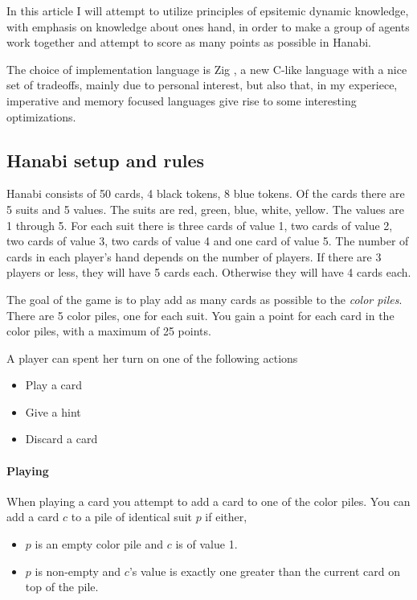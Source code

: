 In this article I will attempt to utilize principles of epsitemic dynamic knowledge, with emphasis on knowledge about ones hand, in order to make a group of agents work together and attempt to score as many points as possible in Hanabi. 

The choice of implementation language is Zig \cite{Ziglang}, a new C-like language with a nice set of tradeoffs, mainly due to personal interest, but also that, in my experiece, imperative and memory focused languages give rise to some interesting optimizations. 




\subsection{Hanabi setup and rules}
Hanabi consists of 50 cards, 4 black tokens, 8 blue tokens.  
Of the cards there are 5 suits and 5 values. 
The suits are red, green, blue, white, yellow. 
The values are 1 through 5. 
For each suit there is three cards of value 1, two cards of value 2, two cards of value 3, two cards of value 4 and one card of value 5.
The number of cards in each player's hand depends on the number of players. If there are 3 players or less, they will have 5 cards each. Otherwise they will have 4 cards each.

The goal of the game is to play add as many cards as possible to the \emph{color piles}. 
There are 5 color piles, one for each suit. You gain a point for each card in the color piles, with a maximum of 25 points.

A player can spent her turn on one of the following actions

\begin{itemize}
\item Play a card
\item Give a hint
\item Discard a card
\end{itemize}

\paragraph{Playing}
When playing a card you attempt to add a card to one of the color piles.
You can add a card $c$ to a pile of identical suit $p$ if either, 

\begin{itemize}	
\item $p$ is an empty color pile and $c$ is of value 1.
\item $p$ is non-empty and $c$'s value is exactly one greater than the current card on top of the pile.
\end{itemize}

